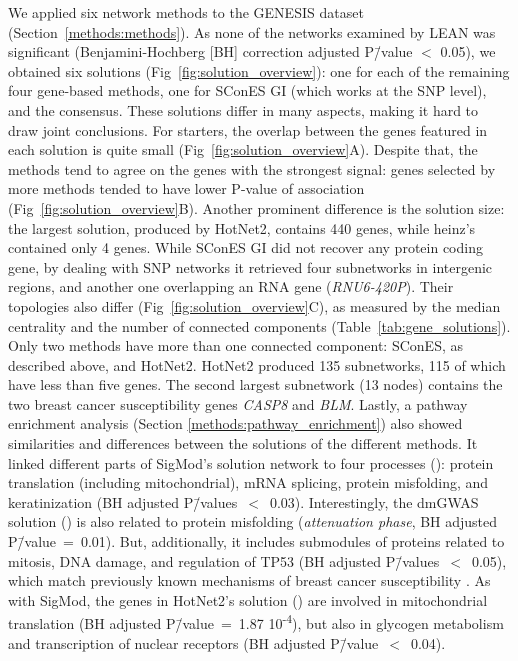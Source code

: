 \documentclass[10pt,letterpaper]{article}
\begin{document}
We applied six network methods to the GENESIS dataset (Section~\ref{methods:methods}). As none of the networks examined by LEAN was significant (Benjamini-Hochberg [BH] correction adjusted P\=/value $<$ 0.05), we obtained six solutions (Fig~\ref{fig:solution_overview}): one for each of the remaining four gene-based methods, one for SConES GI (which works at the SNP level), and the consensus. These solutions differ in many aspects, making it hard to draw joint conclusions. For starters, the overlap between the genes featured in each solution is quite small (Fig~\ref{fig:solution_overview}A). Despite that, the methods tend to agree on the genes with the strongest signal: genes selected by more methods tended to have lower P-value of association (Fig~\ref{fig:solution_overview}B). Another prominent difference is the solution size: the largest solution, produced by HotNet2, contains 440 genes, while heinz's contained only 4 genes. While SConES GI did not recover any protein coding gene, by dealing with SNP networks it retrieved four subnetworks in intergenic regions, and another one overlapping an RNA gene (\emph{RNU6-420P}). Their topologies also differ (Fig~\ref{fig:solution_overview}C), as measured by the median centrality  and the number of connected components (Table~\ref{tab:gene_solutions}). Only two methods have more than one connected component: SConES, as described above, and HotNet2. HotNet2 produced 135 subnetworks, 115 of which have less than five genes. The second largest subnetwork (13 nodes) contains the two breast cancer susceptibility genes \emph{CASP8} and \emph{BLM}. Lastly, a pathway enrichment analysis (Section \ref{methods:pathway_enrichment}) also showed similarities and differences between the solutions of the different methods. It linked different parts of SigMod's solution network to four processes (): protein translation (including mitochondrial), mRNA splicing, protein misfolding, and keratinization (BH adjusted P\=/values~$<$~0.03). Interestingly, the dmGWAS solution () is also related to protein misfolding (\emph{attenuation phase}, BH adjusted P\=/value~=~0.01). But, additionally, it includes submodules of proteins related to mitosis, DNA damage, and regulation of TP53 (BH adjusted P\=/values~$<$~0.05), which match previously known mechanisms of breast cancer susceptibility \cite{nielsen_hereditary_2016}. As with SigMod, the genes in HotNet2's solution () are involved in mitochondrial translation (BH adjusted P\=/value~=~1.87 \texttimes{} 10\textsuperscript{-4}), but also in glycogen metabolism and transcription of nuclear receptors (BH adjusted P\=/value~$<$~0.04).
\end{document}
